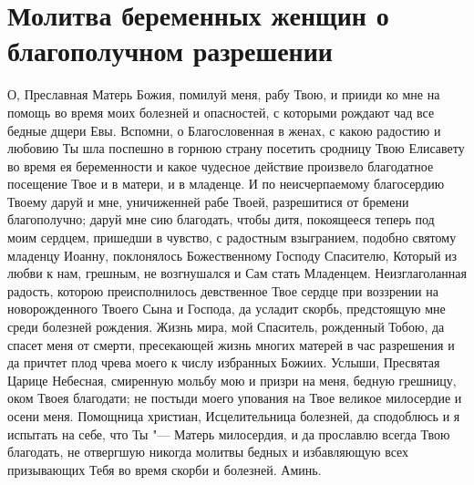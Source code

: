 \section{Молитва беременных женщин о благополучном разрешении}\begin{mymulticols}



О, Преславная Матерь Божия, помилуй меня, рабу Твою, и прииди ко мне на помощь во время моих болезней и опасностей, с которыми рождают чад все бедные дщери Евы. Вспомни, о Благословенная в женах, с какою радостию и любовию Ты шла поспешно в горнюю страну посетить сродницу Твою Елисавету во время ея беременности и какое чудесное действие произвело благодатное посещение Твое и в матери, и в младенце. И по неисчерпаемому благосердию Твоему даруй и мне, уничиженней рабе Твоей, разрешитися от бремени благополучно; даруй мне сию благодать, чтобы дитя, покоящееся теперь под моим сердцем, пришедши в чувство, с радостным взыгранием, подобно святому младенцу Иоанну, поклонялось Божественному Господу Спасителю, Который из любви к нам, грешным, не возгнушался и Сам стать Младенцем. Неизглаголанная радость, которою преисполнилось девственное Твое сердце при воззрении на новорожденного Твоего Сына и Господа, да усладит скорбь, предстоящую мне среди болезней рождения. Жизнь мира, мой Спаситель, рожденный Тобою, да спасет меня от смерти, пресекающей жизнь многих матерей в час разрешения и да причтет плод чрева моего к числу избранных Божиих. Услыши, Пресвятая Царице Небесная, смиренную мольбу мою и призри на меня, бедную грешницу, оком Твоея благодати; не постыди моего упования на Твое великое милосердие и осени меня. Помощница христиан, Исцелительница болезней, да сподоблюсь и я испытать на себе, что Ты "--- Матерь милосердия, и да прославлю всегда Твою благодать, не отвергшую никогда молитвы бедных и избавляющую всех призывающих Тебя во время скорби и болезней. Аминь.


\end{mymulticols}

